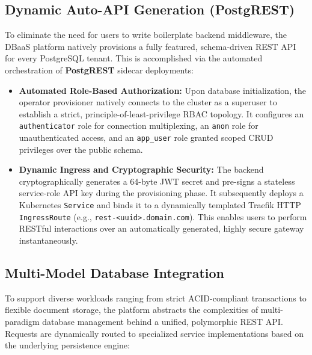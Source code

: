\subsection{Dynamic Auto-API Generation (PostgREST)}

To eliminate the need for users to write boilerplate backend middleware, the DBaaS platform natively provisions a fully featured, schema-driven REST API for every PostgreSQL tenant. This is accomplished via the automated orchestration of \textbf{PostgREST} sidecar deployments:

\begin{itemize}
    \item \textbf{Automated Role-Based Authorization:} Upon database initialization, the operator provisioner natively connects to the cluster as a superuser to establish a strict, principle-of-least-privilege RBAC topology. It configures an \texttt{authenticator} role for connection multiplexing, an \texttt{anon} role for unauthenticated access, and an \texttt{app\_user} role granted scoped CRUD privileges over the public schema.
    \item \textbf{Dynamic Ingress and Cryptographic Security:} The backend cryptographically generates a 64-byte JWT secret and pre-signs a stateless service-role API key during the provisioning phase. It subsequently deploys a Kubernetes \texttt{Service} and binds it to a dynamically templated Traefik HTTP \texttt{IngressRoute} (e.g., \texttt{rest-<uuid>.domain.com}). This enables users to perform RESTful interactions over an automatically generated, highly secure gateway instantaneously.
\end{itemize}

\subsection{Multi-Model Database Integration}

To support diverse workloads ranging from strict ACID-compliant transactions to flexible document storage, the platform abstracts the complexities of multi-paradigm database management behind a unified, polymorphic REST API. Requests are dynamically routed to specialized service implementations based on the underlying persistence engine:

